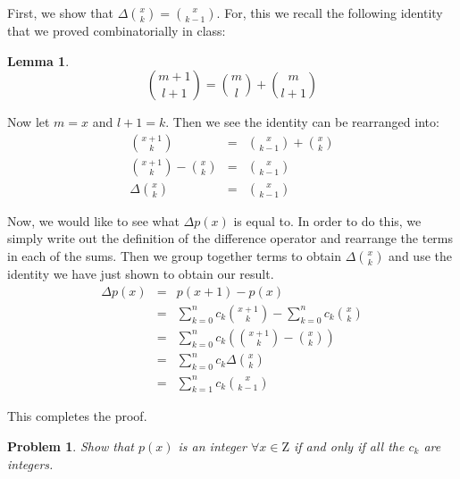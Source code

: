 \documentclass[psamsfonts]{amsart}
\newtheorem{prob}{Problem}[section]
\newtheorem{lem}[thm]{Lemma}
\newenvironment{sol}{{\bfseries Solution}}{\qedsymbol}
\theoremstyle{definition}
\theoremstyle{remark}
\numberwithin{equation}{section}
\begin{document}
\begin{sol}
First, we show that $\Delta {x \choose k} = { x \choose k-1 }$. For, this we recall the following identity that we proved combinatorially in class:
\begin{lem}
\begin{equation}
{m + 1 \choose l + 1} = {m \choose l} + {m \choose {l+ 1}}
\end{equation}
\end{lem}

Now let $m = x$ and $l + 1 = k$. Then we see the identity can be rearranged into:
\begin{eqnarray}
{x +1 \choose k} &=& {x \choose k - 1} + {x \choose k} \\
{x + 1 \choose k} - {x \choose k} &=& {x \choose k - 1} \\
\Delta {x \choose k} &=& {x \choose k - 1}
\end{eqnarray}

Now, we would like to see what $\Delta p(x)$ is equal to. In order to do this, we simply write out the definition of the difference operator and rearrange the terms in each of the sums. Then we group together terms to obtain $\Delta {x \choose k}$ and use the identity we have just shown to obtain our result.
\begin{eqnarray}
\Delta p(x) &=& p(x + 1) - p(x) \\
&=& \sum_{k=0}^n c_k {x + 1 \choose k} - \sum_{k=0}^n c_k {x \choose k} \\
&=& \sum_{k=0}^n c_k \left( {x + 1 \choose k} - {x \choose k} \right) \\
&=& \sum_{k=0}^n c_k \Delta {x \choose k} \\
&=& \sum_{k=1}^n c_k {x \choose k - 1}
\end{eqnarray}

This completes the proof.
\end{sol}

\begin{prob}
Show that $p(x)$ is an integer $\forall x \in \mathrm{Z}$ if and only if all the $c_k$ are integers.
\end{prob}
\end{document}
